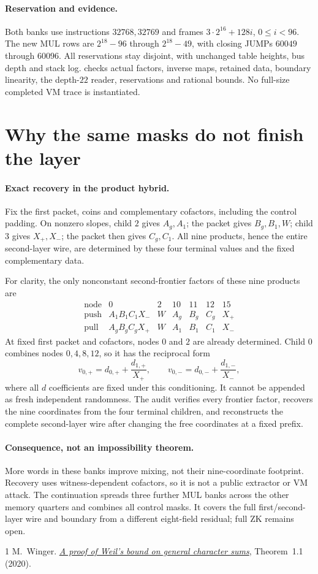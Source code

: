 \documentclass[11pt]{article}
\begin{document}
\paragraph{Reservation and evidence.} Both banks use instructions $32768,32769$ and frames $3\cdot2^{16}+128i$, $0\le i<96$. The new MUL rows are $2^{18}-96$ through $2^{18}-49$, with closing JUMPs $60049$ through $60096$. All reservations stay disjoint, with unchanged table heights, bus depth and stack log.  checks actual factors, inverse maps, retained data, boundary linearity, the depth-$22$ reader, reservations and rational bounds. No full-size completed VM trace is instantiated.

\section{Why the same masks do not finish the layer}

\paragraph{Exact recovery in the product hybrid.} Fix the first packet, coins and complementary cofactors, including the control padding. On nonzero slopes, child $2$ gives $A_g,A_1$; the packet gives $B_g,B_1,W$; child $3$ gives $X_+,X_-$; the packet then gives $C_g,C_1$. All nine products, hence the entire second-layer wire, are determined by these four terminal values and the fixed complementary data.

For clarity, the only nonconstant second-frontier factors of these nine products are
\[
\begin{array}{c|rrrrrr}
 \text{node}&0&2&10&11&12&15\\\hline
 \text{push}&A_1B_1C_1X_-&W&A_g&B_g&C_g&X_+\\
 \text{pull}&A_gB_gC_gX_+&W&A_1&B_1&C_1&X_-
\end{array}
\]
At fixed first packet and cofactors, nodes $0$ and $2$ are already determined. Child $0$ combines nodes $0,4,8,12$, so it has the reciprocal form
\[
 v_{0,+}=d_{0,+}+\frac{d_{1,+}}{X_+},\qquad
 v_{0,-}=d_{0,-}+\frac{d_{1,-}}{X_-},
\]
where all $d$ coefficients are fixed under this conditioning. It cannot be appended as fresh independent randomness. The audit verifies every frontier factor, recovers the nine coordinates from the four terminal children, and reconstructs the complete second-layer wire after changing the free coordinates at a fixed prefix.

\paragraph{Consequence, not an impossibility theorem.} More words in these banks improve mixing, not their nine-coordinate footprint. Recovery uses witness-dependent cofactors, so it is not a public extractor or VM attack. The continuation  spreads three further MUL banks across the other memory quarters and combines all control masks. It covers the full first/second-layer wire and boundary from a different eight-field residual; full ZK remains open.

\begin{thebibliography}{1}
 M.~Winger. \href{https://people.math.ethz.ch/~pinkri/Theses/2020-Bachelor-Moritz-Winger.pdf}{\emph{A proof of Weil's bound on general character sums}}, Theorem~1.1 (2020).
\end{thebibliography}
\end{document}
